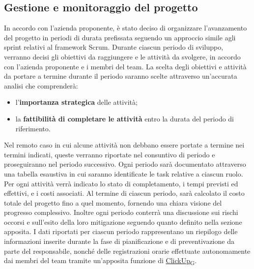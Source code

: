 \subsection{Gestione e monitoraggio del progetto}
In accordo con l'azienda proponente, è stato deciso di organizzare l’avanzamento del progetto in periodi di durata prefissata seguendo un approccio simile agli sprint relativi al framework Scrum.
Durante ciascun periodo di sviluppo, verranno decisi gli obiettivi da raggiungere e le attività da svolgere, in accordo con l'azienda proponente e i membri del team. La scelta degli obiettivi e attività da portare a termine durante il periodo saranno scelte attraverso un'accurata analisi che comprenderà:
\begin{itemize}
    \item l'\textbf{importanza strategica} delle attività;
    \item la \textbf{fattibilità di completare le attività} entro la durata del periodo di riferimento.
\end{itemize}
Nel remoto caso in cui alcune attività non debbano essere portate a termine nei termini indicati, queste verranno riportate nel consuntivo di periodo e proseguiranno nel periodo successivo. Ogni periodo sarà documentato attraverso una tabella esaustiva in cui saranno identificate le task relative a ciascun ruolo. Per ogni attività verrà indicato lo stato di completamento, i tempi previsti ed effettivi, e i costi associati. Al termine di ciascun periodo, sarà calcolato il costo totale del progetto fino a quel momento, fornendo una chiara visione del progresso complessivo.
Inoltre ogni periodo conterrà una discussione sui rischi occorsi e sull’esito della loro mitigazione seguendo quanto definito nella sezione apposita.
I dati riportati per ciascun periodo rappresentano un riepilogo delle informazioni inserite durante la fase di pianificazione e di preventivazione da parte del responsabile, nonché delle registrazioni orarie effettuate autonomamente dai membri del team tramite un'apposita funzione di \href{https://7last.github.io/docs/rtb/documentazione-interna/glossario#clickup}{ClickUp\textsubscript{G}}.
